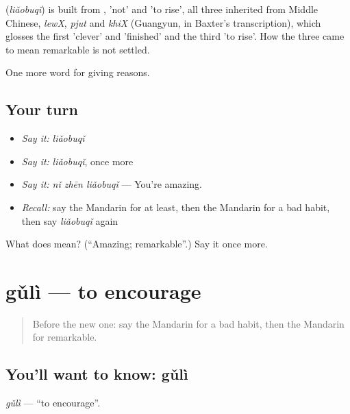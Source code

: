 \begin{cousinweb}
\textbf{} (\emph{liǎobuqǐ}) is built from ,  'not' and  'to rise', all three inherited from Middle Chinese, \emph{lewX}, \emph{pjut} and \emph{khiX} (Guangyun, in Baxter's transcription), which glosses the first 'clever' and 'finished' and the third 'to rise'. How the three came to mean remarkable is not settled.
\end{cousinweb}

\begin{grammarlens}[title={What you've built}]
One more word for giving reasons.
\end{grammarlens}

\subsection*{Your turn}
\begin{itemize}
\raggedright
  \item \emph{Say it:} \emph{liǎobuqǐ}
  \item \emph{Say it:} \emph{liǎobuqǐ}, once more
  \item \emph{Say it:} \emph{nǐ zhēn liǎobuqǐ} — You're amazing.
  \item \emph{Recall:} say the Mandarin for at least, then the Mandarin for a bad habit, then say \emph{liǎobuqǐ} again
\end{itemize}

\begin{tcolorbox}[breakable,colback=teal!4,colframe=teal!35!black,title={Before you move on}]
What does  mean? (\textquotedblleft{}Amazing; remarkable\textquotedblright{}.) Say it once more.
\end{tcolorbox}
\section[gǔlì]{gǔlì — to encourage}

\label{lesson:ZH-C368-guli}



\begin{quote}
Before the new one: say the Mandarin for a bad habit, then the Mandarin for remarkable.
\end{quote}

\subsection*{You'll want to know: gǔlì}
\emph{gǔlì} — \textquotedblleft{}to encourage\textquotedblright{}.

